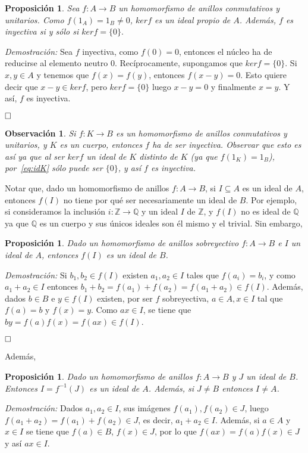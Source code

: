 \documentclass[12pt]{article}
\newtheorem{proposition}[theorem]{Proposición}
\newtheorem{observation}{Observación}[theorem]
\begin{document}
\begin{proposition} Sea $f \colon A \longrightarrow B$ un homomorfismo de anillos conmutativos y unitarios. Como $f(1_{A}) = 1_{B} \neq 0$, $ker f$ es un ideal propio de $A$. Además, $f$ es inyectiva si y sólo si $ker f = \lbrace 0 \rbrace.$
\end{proposition}
\emph{Demostración: } Sea $f$ inyectiva, como $f(0) = 0$, entonces el núcleo ha de reducirse al elemento neutro $0$. Recíprocamente, supongamos que $ker f = \lbrace 0 \rbrace$. Si $x,y \in A$ y tenemos que $f(x) = f(y)$, entonces $f(x-y)= 0$. Esto quiere decir que $x-y \in ker f$, pero $ker f = \lbrace 0 \rbrace$ luego $x-y = 0$ y finalmente $x = y$. Y así, $f$ es inyectiva.

$\hfill \square$

\begin{observation} Si $f \colon K \longrightarrow B$ es un homomorfismo de anillos conmutativos y unitarios, y $K$ es un cuerpo, entonces $f$ ha de ser inyectiva. Observar que esto es así ya que al ser $ker f$ un ideal de $K$ distinto de $K$ (ya que $f(1_{K}) = 1_{B}$), por~\ref{eq:idK} sólo puede ser $\lbrace 0 \rbrace$, y así $f$ es inyectiva.
\end{observation}

Notar que, dado un homomorfismo de anillos $f \colon A \longrightarrow B$, si $I \subseteq A$ es un ideal de $A$, entonces $f(I)$ no tiene por qué ser necesariamente un ideal de $B$. Por ejemplo, si consideramos la inclusión $i \colon \mathbb{Z} \longrightarrow \mathbb{Q}$ y un ideal $I$ de $\mathbb{Z}$, y $f(I)$ no es ideal de $\mathbb{Q}$ ya que $\mathbb{Q}$ es un cuerpo y sus únicos ideales son él mismo y el trivial. Sin embargo, 

\begin{proposition}Dado un homomorfismo de anillos sobreyectivo $f \colon A \longrightarrow B$ e $I$ un ideal de $A$, entonces $f(I)$ es un ideal de $B$.
\end{proposition}
\emph{Demostración: }Si $b_1, b_2 \in f(I)$ existen $a_1,a_2 \in I$ tales que $f(a_i)=b_i$, y como $a_1+a_2 \in I$ entonces $b_1+b_2 =f(a_1)+f(a_2)=f(a_1+a_2)\in f(I)$. Además, dados $b \in B$ e $y \in f(I)$ existen, por ser $f$ sobreyectiva, $a \in A, x \in I$ tal que $f(a)=b$ y $f(x)=y$. Como $ax \in I$, se tiene que $by = f(a)f(x) = f(ax) \in f(I)$.

$\hfill \square$

Además, 

\begin{proposition}\label{eq:idif} Dado un homomorfismo de anillos $f \colon A \longrightarrow B$ y $J$ un ideal de $B$. Entonces $I = f^{-1}(J)$ es un ideal de $A$. Además, si $J \neq B$ entonces $I \neq A$.
\end{proposition}
\emph{Demostración: }Dados $a_1, a_2 \in I$, sus imágenes $f(a_1), f(a_2) \in J$, luego $f(a_1+a_2)  = f(a_1)+f(a_2) \in J$, es decir, $a_1+a_2 \in I$. Además, si $a \in A$ y $x \in I$ se tiene que $f(a) \in B$, $f(x) \in J$, por lo que $f(ax)=f(a)f(x) \in J$ y así $ax \in I$.
\end{document}
